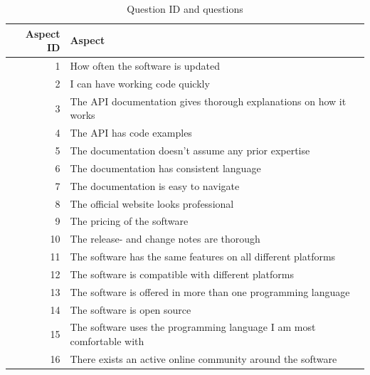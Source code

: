 \documentclass{article}
\begin{document}
\begin{table}[H]
\centering
\begin{tabular}{r|l}
\textbf{Aspect ID} & \textbf{Aspect} \\ \hline
1   & How often the software is updated                                         \\
2   & I can have working code quickly                                           \\
3   & The API documentation gives thorough explanations on how it works         \\
4   & The API has code examples                                                 \\
5   & The documentation doesn't assume any prior expertise                      \\
6   & The documentation has consistent language                                 \\
7   & The documentation is easy to navigate                                         \\
8   & The official website looks professional\\
9   & The pricing of the software\\
10  & The release- and change notes are thorough\\
11  & The software has the same features on all different platforms\\
12  & The software is compatible with different platforms\\
13  & The software is offered in more than one programming language\\
14  & The software is open source\\
15  & The software uses the programming language I am most comfortable with\\
16  & There exists an active online community around the software\\ \hline
\end{tabular}
\caption{Question ID and questions}
\label{tab:questionID}
\end{table}
\end{document}
